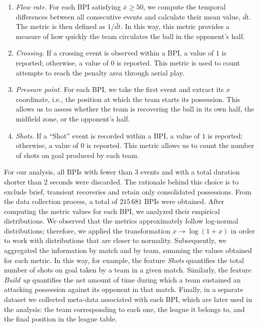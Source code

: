 \documentclass[preprint, amsmath,amssymb, pre]{revtex4-2}
\begin{document}
\begin{enumerate}
    \item {\it Flow rate.} For each BPI satisfying $\bar{x}\geq50$, we compute the temporal differences between all consecutive events and calculate their mean value, $\bar{dt}$. The metric is then defined as $1/\bar{dt}$. In this way, this metric provides a measure of how quickly the team circulates the ball in the opponent’s half.

    \item {\it Crossing.} If a crossing event is observed within a BPI, a value of $1$ is reported; otherwise, a value of $0$ is reported. This metric is used to count attempts to reach the penalty area through aerial play.

    \item {\it Pressure point.} For each BPI, we take the first event and extract its $x$ coordinate, i.e., the position at which the team starts its possession. This allows us to assess whether the team is recovering the ball in its own half, the midfield zone, or the opponent’s half.
 
    \item {\it Shots.} If a ``Shot'' event is recorded within a BPI, a value of $1$ is reported; otherwise, a value of $0$ is reported. This metric allows us to count the number of shots on goal produced by each team.
    
\end{enumerate}

For our analysis, all BPIs with fewer than 3 events and with a total duration shorter than 2 seconds were discarded. The rationale behind this choice is to exclude brief, transient recoveries and retain only consolidated possessions.  
From the data collection process, a total of $215\,681$ BPIs were obtained.
%
After computing the metric values for each BPI, we analyzed their empirical distributions. We observed that the metrics approximately follow log-normal distributions; therefore, we applied the transformation $x \rightarrow \log(1+x)$ in order to work with distributions that are closer to normality.  
%
Subsequently, we aggregated the information by match and by team, summing the values obtained for each metric. In this way, for example, the feature {\it Shots} quantifies the total number of shots on goal taken by a team in a given match.  
Similarly, the feature {\it Build up} quantifies the net amount of time during which a team sustained an attacking possession against its opponent in that match.
%  
Finally, in a separate dataset we collected meta-data associated with each BPI, which are later used in the analysis: the team corresponding to each one, the league it belongs to, and the final position in the league table.
\end{document}
